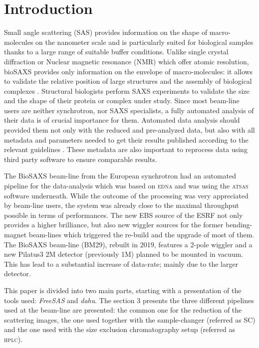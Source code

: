 \documentclass[preprint]{iucr}              %
\begin{document}
\section{Introduction}
Small angle scattering (SAS) provides information on the shape of macro-molecules on the nanometer scale and is particularly suited for biological samples thanks to a large range of suitable buffer conditions.
Unlike single crystal diffraction or Nuclear magnetic resonance (NMR) which offer atomic resolution, bioSAXS provides only information on the envelope of macro-molecules: it allows to validate the relative position of large structures and the assembly of biological complexes \cite{biosaxs_rev2018}. 
Structural biologists perform SAXS experiments to validate the size and the shape of their protein or complex under study. 
Since most beam-line users are neither synchrotron, nor SAXS specialists, a fully automated analysis of their data is of crucial importance for them. 
Automated data analysis should provided them not only with the reduced and pre-analyzed data, but also with all metadata and parameters needed to get their results published according to the relevant guidelines \cite{guidelines_2017}.
These metadata are also important to reprocess data using third party software to ensure comparable results. 

The BioSAXS beam-line from the European synchrotron \cite{BM29paper} had an automated pipeline for the data-analysis which was based on \textsc{edna} \cite{edna} and was using the \textsc{atsas} \cite{ATSAS2} software underneath. 
While the outcome of the processing was very appreciated by beam-line users, the system was already close to the maximal throughput possible in terms of performances. 
The new EBS source \cite{EBS} of the ESRF not only provides a higher brilliance, but also new wiggler sources for the former bending-magnet beam-lines which triggered the re-build and the upgrade of most of them. 
The BioSAXS beam-line (BM29), rebuilt in 2019, features a 2-pole wiggler and a new Pilatus3 2M detector (previously 1M) planned to be mounted in vacuum. 
This has lead to a substantial increase of data-rate; mainly due to the larger detector. 

This paper is divided into two main parts, starting with a presentation of the tools used: \textit{FreeSAS} and \textit{dahu}.
The section 3 presents the three different pipelines used at the beam-line are presented: the common one for the reduction of the scattering images, the one used together with the sample-changer (referred as SC) and the one used with the size exclusion chromatography setup (referred as \textsc{hplc}).
\end{document}
